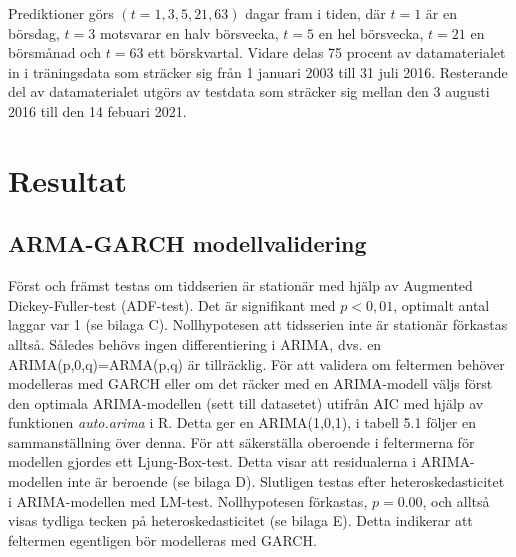 \documentclass[11pt]{article}
\numberwithin{equation}{section}
\numberwithin{table}{section}
\numberwithin{figure}{section}
\begin{document}

Prediktioner görs $(t=1, 3, 5, 21, 63)$ dagar fram i tiden, där $t=1$ är en börsdag,  $t=3$ motsvarar en halv börsvecka, $t=5$ en hel börsvecka, $t=21$ en börsmånad och $t=63$ ett börskvartal. Vidare delas 75 procent av datamaterialet in i träningsdata som sträcker sig från 1 januari 2003 till 31 juli 2016. Resterande del av datamaterialet utgörs av testdata som sträcker sig mellan den 3 augusti 2016 till den 14 febuari 2021. 

\newpage
\section{Resultat}
\subsection{ARMA-GARCH modellvalidering}
Först och främst testas om tiddserien är stationär med hjälp av Augmented Dickey-Fuller-test (ADF-test). Det är signifikant med $p<0,01$, optimalt antal laggar var 1 (se bilaga C). Nollhypotesen att tidsserien inte är stationär förkastas alltså. Således behövs ingen differentiering i ARIMA, dvs. en ARIMA(p,0,q)=ARMA(p,q) är tillräcklig. För att validera om feltermen behöver modelleras med GARCH eller om det räcker med en ARIMA-modell väljs först den optimala ARIMA-modellen (sett till datasetet) utifrån AIC med hjälp av funktionen \textit{auto.arima} i R. Detta ger en ARIMA(1,0,1), i tabell 5.1 följer en sammanställning över denna. För att säkerställa oberoende i feltermerna för modellen gjordes ett Ljung-Box-test. Detta visar att residualerna i ARIMA-modellen inte är beroende (se bilaga D). Slutligen testas efter heteroskedasticitet i ARIMA-modellen med LM-test. Nollhypotesen förkastas, $p=0.00$, och alltså visas tydliga tecken på heteroskedasticitet (se bilaga E). Detta indikerar att feltermen egentligen bör modelleras med GARCH. 
\end{document}
